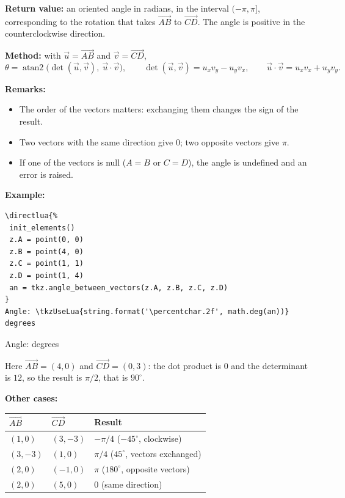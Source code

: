 \noindent\textbf{Return value:}
an oriented angle in radians, in the interval $(-\pi,\pi]$, corresponding to
the rotation that takes $\overrightarrow{AB}$ to $\overrightarrow{CD}$.
The angle is positive in the counterclockwise direction.

\medskip
\noindent\textbf{Method:}
with $\vec u=\overrightarrow{AB}$ and $\vec v=\overrightarrow{CD}$,
\[
  \theta = \operatorname{atan2}\bigl(\det(\vec u,\vec v),\ \vec u\cdot\vec v\bigr),
  \qquad
  \det(\vec u,\vec v)=u_x v_y-u_y v_x,
  \qquad
  \vec u\cdot\vec v = u_x v_x+u_y v_y .
\]

\noindent\textbf{Remarks:}
\begin{itemize}
  \item The order of the vectors matters: exchanging them changes the sign
        of the result.
  \item Two vectors with the same direction give $0$; two opposite vectors
        give $\pi$.
  \item If one of the vectors is null ($A=B$ or $C=D$), the angle is
        undefined and an error is raised.
\end{itemize}

\medskip
\noindent\textbf{Example:}
\begin{Verbatim}
\directlua{%
 init_elements()
 z.A = point(0, 0)
 z.B = point(4, 0)
 z.C = point(1, 1)
 z.D = point(1, 4)
 an = tkz.angle_between_vectors(z.A, z.B, z.C, z.D)
}
Angle: \tkzUseLua{string.format('\percentchar.2f', math.deg(an))} degrees
\end{Verbatim}
Angle:  degrees

Here $\overrightarrow{AB}=(4,0)$ and $\overrightarrow{CD}=(0,3)$:
the dot product is $0$ and the determinant is $12$, so the result is
$\pi/2$, that is $90^\circ$.

\medskip
\noindent\textbf{Other cases:}

\begin{center}
\begin{tabular}{lll}
  \hline
  $\overrightarrow{AB}$ & $\overrightarrow{CD}$ & Result \\
  \hline
  $(1,0)$  & $(3,-3)$ & $-\pi/4$ \quad ($-45^\circ$, clockwise) \\
  $(3,-3)$ & $(1,0)$  & $\pi/4$ \quad ($45^\circ$, vectors exchanged) \\
  $(2,0)$  & $(-1,0)$ & $\pi$ \quad ($180^\circ$, opposite vectors) \\
  $(2,0)$  & $(5,0)$  & $0$ \quad (same direction) \\
  \hline
\end{tabular}
\end{center}

